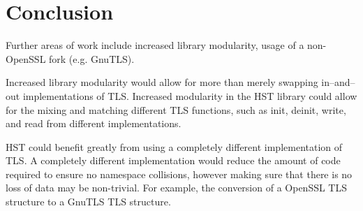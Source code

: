\documentclass{acm_proc_article-sp}
\begin{document}
\section{Conclusion}

Further areas of work include increased library modularity, usage of a
non-OpenSSL fork (e.g. GnuTLS).

Increased library modularity would allow for more than merely swapping
in--and--out implementations of TLS. Increased modularity in the HST library
could allow for the mixing and matching different TLS functions, such as init,
deinit, write, and read from different implementations.

HST could benefit greatly from using a completely different implementation of
TLS. A completely different implementation would reduce the amount of code
required to ensure no namespace collisions, however making sure that there is no
loss of data may be non-trivial. For example, the conversion of a OpenSSL TLS
structure to a GnuTLS TLS structure.




\balancecolumns
\end{document}
